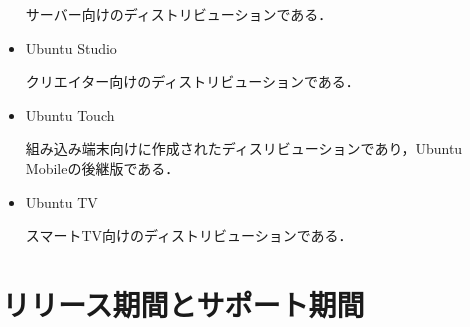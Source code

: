 \begin{itemize}
サーバー向けのディストリビューションである．

 \item	Ubuntu Studio

クリエイター向けのディストリビューションである．

 \item	Ubuntu Touch

組み込み端末向けに作成されたディスリビューションであり，Ubuntu Mobileの後継版である．

 \item	Ubuntu TV

スマートTV向けのディストリビューションである．



\end{itemize}


\clearpage


\section{リリース期間とサポート期間}



